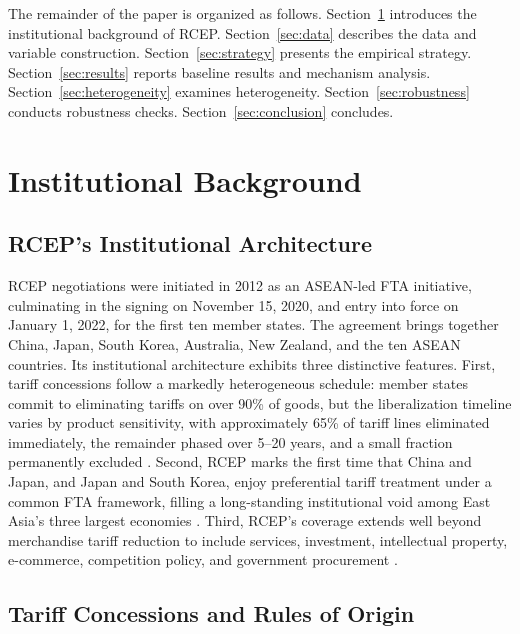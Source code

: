 \documentclass[preprint,12pt,authoryear]{elsarticle}
\begin{document}
The remainder of the paper is organized as follows. Section~\ref{sec:background} introduces the institutional background of RCEP. Section~\ref{sec:data} describes the data and variable construction. Section~\ref{sec:strategy} presents the empirical strategy. Section~\ref{sec:results} reports baseline results and mechanism analysis. Section~\ref{sec:heterogeneity} examines heterogeneity. Section~\ref{sec:robustness} conducts robustness checks. Section~\ref{sec:conclusion} concludes.

\section{Institutional Background}
\label{sec:background}

\subsection{RCEP's Institutional Architecture}

RCEP negotiations were initiated in 2012 as an ASEAN-led FTA initiative, culminating in the signing on November 15, 2020, and entry into force on January 1, 2022, for the first ten member states. The agreement brings together China, Japan, South Korea, Australia, New Zealand, and the ten ASEAN countries. Its institutional architecture exhibits three distinctive features. First, tariff concessions follow a markedly heterogeneous schedule: member states commit to eliminating tariffs on over 90\% of goods, but the liberalization timeline varies by product sensitivity, with approximately 65\% of tariff lines eliminated immediately, the remainder phased over 5--20 years, and a small fraction permanently excluded \cite{liu2022rcep}. Second, RCEP marks the first time that China and Japan, and Japan and South Korea, enjoy preferential tariff treatment under a common FTA framework, filling a long-standing institutional void among East Asia's three largest economies \cite{ping2021rcep}. Third, RCEP's coverage extends well beyond merchandise tariff reduction to include services, investment, intellectual property, e-commerce, competition policy, and government procurement \cite{shen2020rcep}.

\subsection{Tariff Concessions and Rules of Origin}
\end{document}
